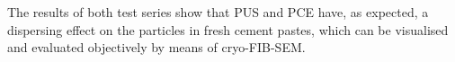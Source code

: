 The results of both test series show that \ac{PUS} and \ac{PCE} have, as expected, a dispersing effect on the particles in fresh cement pastes, which can be visualised and evaluated objectively by means of cryo-\ac{FIB}-\ac{SEM}. %



